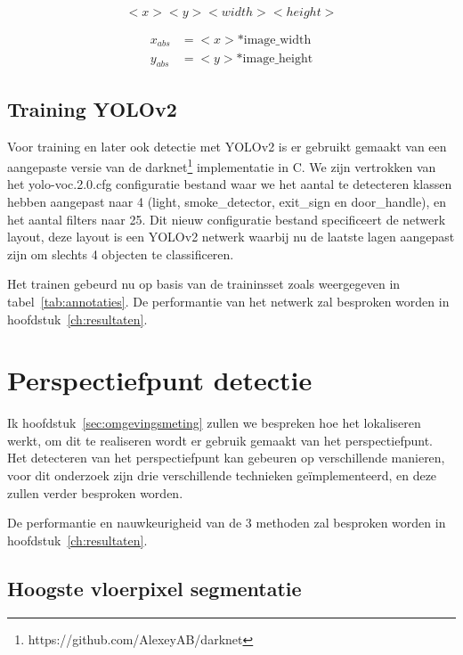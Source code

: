 \begin{equation} \label{eq:yolo}
  <x> <y> <width> <height>
\end{equation}

\begin{equation} \label{eq:yolo_abs}
    \begin{split}
        x_{abs} &= <x> *  \mathrm{image\_width} \\
        y_{abs} &= <y> * \mathrm{image\_height}
    \end{split}
\end{equation}


\subsection{Training YOLOv2}

Voor training en later ook detectie met YOLOv2 is er gebruikt gemaakt van een aangepaste versie van de darknet\footnote{https://github.com/AlexeyAB/darknet} implementatie in C.
We zijn vertrokken van het yolo-voc.2.0.cfg configuratie bestand waar we het aantal te detecteren klassen hebben aangepast naar 4 (light, smoke\_detector, exit\_sign en door\_handle), en het aantal filters naar 25.
Dit nieuw configuratie bestand specificeert de netwerk layout, deze layout is een YOLOv2 netwerk waarbij nu de laatste lagen aangepast zijn om slechts 4 objecten te classificeren.

Het trainen gebeurd nu op basis van de traininsset zoals weergegeven in tabel~\ref{tab:annotaties}. De performantie van het netwerk zal besproken worden in hoofdstuk~\ref{ch:resultaten}.


\section{Perspectiefpunt detectie}

Ik hoofdstuk~\ref{sec:omgevingsmeting} zullen we bespreken hoe het lokaliseren werkt, om dit te realiseren wordt er gebruik gemaakt van het perspectiefpunt.
Het detecteren van het perspectiefpunt kan gebeuren op verschillende manieren, voor dit onderzoek zijn drie verschillende technieken ge\"{i}mplementeerd, en deze zullen verder besproken worden.

De performantie en nauwkeurigheid van de 3 methoden zal besproken worden in hoofdstuk~\ref{ch:resultaten}.

\subsection{Hoogste vloerpixel segmentatie}\label{sec:seg_highest}

